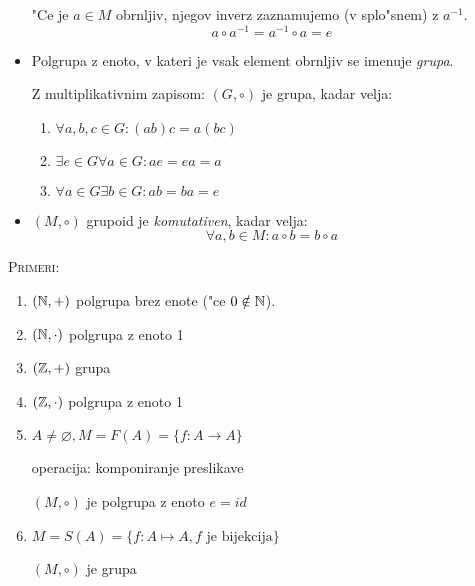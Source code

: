 \begin{itemize}
	"Ce je $a \in M$ obrnljiv, njegov inverz zaznamujemo (v splo"snem) z $a^{-1}$.
	\begin{equation*}
	a \circ a^{-1} = a^{-1} \circ a = e
	\end{equation*}
	
	\item Polgrupa z enoto, v kateri je vsak element obrnljiv se imenuje \emph{grupa}.
	
	Z multiplikativnim zapisom: $(G, \circ)$ je grupa, kadar velja:
	\begin{enumerate}[(1)]
		\item $\forall a, b, c \in G: (ab)c = a(bc)$
		\item $\exists e \in G \forall a \in G: ae = ea = a$
		\item $\forall a \in G \exists b \in G: ab = ba = e$
	\end{enumerate}

	\item $(M, \circ)$ grupoid je \emph{komutativen}, kadar velja:
	\begin{equation*}
	\forall a,b \in M: a \circ b = b \circ a
	\end{equation*}
\end{itemize}
%
\textsc{Primeri:}
\begin{enumerate}[(1)]
	\item $(\mathbb{N}, +)$ polgrupa brez enote ("ce $0 \notin \mathbb{N}$).
	\item $(\mathbb{N}, \cdot)$ polgrupa z enoto 1
	\item $(\mathbb{Z}, +)$ grupa
	\item $(\mathbb{Z}, \cdot)$ polgrupa z enoto 1
	\item $A \neq \varnothing, M = F(A) = \{f: A \rightarrow A\}$
	
	operacija: komponiranje preslikave
	
	$(M, \circ)$ je polgrupa z enoto $e = id$
	
	\item $M = S(A) = \{f: A \mapsto A, \text{$f$ je bijekcija}\}$
	
	$(M, \circ)$ je grupa
\end{enumerate}


